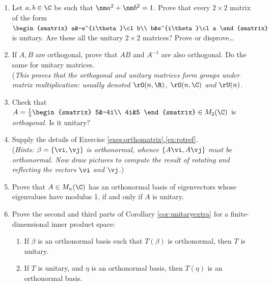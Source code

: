 \begin{exercises}
\begin{enumerate}[label=\thesubsection.\arabic*., align=right]
	\item Let $a,b\in\C$ be such that $\nm a^2+\nm b^2=1$. Prove that every $2\times 2$ matrix of the form $\begin{smatrix}
	a&-e^{i\theta}\cl b\\
	b&e^{i\theta}\cl a
	\end{smatrix}$ is unitary. Are these all the unitary $2\times 2$ matrices? Prove or disprove\ldots
	
	
	\item If $A,B$ are orthogonal, prove that $AB$ and $A^{-1}$ are also orthogonal. Do the same for unitary matrices.\\
	(\emph{This proves that the orthogonal and unitary matrices form groups under matrix multiplication: usually denoted $\rO(n,\R)$, $\rO(n,\C)$ and $\rU(n)$.}
  
  \item\label{ex:comporth} Check that $A=\frac 13\begin{smatrix}
	5&-4i\\
	4i&5
  \end{smatrix}\in M_2(\C)$ is \emph{orthogonal.} Is it unitary? 
  
  \item\label{ex:rotrefmatrix} Supply the details of Exercise \hyperref[exes:orthomatrix]{\ref*{exes:orthomatrix}.\ref*{ex:rotref}}.\\
  (\emph{Hints: $\beta=\{\vi,\vj\}$ is orthonormal, whence $\{A\vi,A\vj\}$ must be orthonormal. Now draw pictures to compute the result of rotating and reflecting the vectors $\vi$ and $\vj$.})
  
  
  \item\label{ex:unitarymatrix} Prove that $A\in M_n(\C)$ has an orthonormal basis of eigenvectors whose eigenvalues have modulus 1, if and only if $A$ is unitary.
  
  
  \item\label{ex:orthbasis} Prove the second and third parts of Corollary \ref{cor:unitaryextra} for a finite-dimensional inner product space:
  \begin{enumerate}
    \item If $\beta$ is an orthonormal basis such that $T(\beta)$ is orthonormal, then $T$ is unitary.
    \item If $T$ is unitary, and $\eta$ is an orthonormal basis, then $T(\eta)$ is an orthonormal basis.
  \end{enumerate}
  

\end{enumerate}
\end{exercises}
